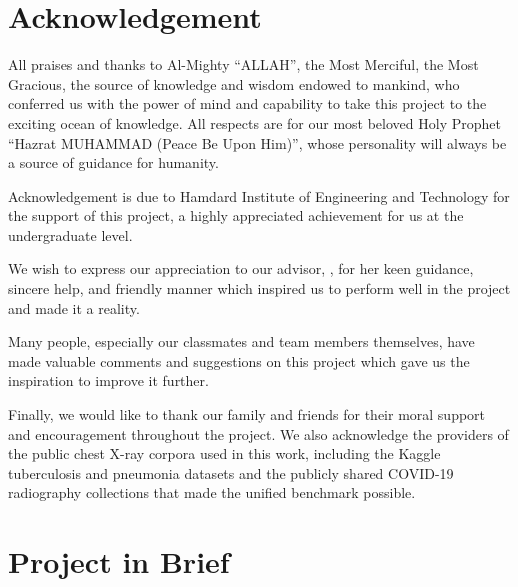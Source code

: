 \chapter*{Acknowledgement}

All praises and thanks to Al-Mighty ``ALLAH'', the Most Merciful, the Most Gracious, the source of knowledge and wisdom endowed to mankind, who conferred us with the power of mind and capability to take this project to the exciting ocean of knowledge. All respects are for our most beloved Holy Prophet ``Hazrat MUHAMMAD (Peace Be Upon Him)'', whose personality will always be a source of guidance for humanity.

Acknowledgement is due to Hamdard Institute of Engineering and Technology for the support of this project, a highly appreciated achievement for us at the undergraduate level.

We wish to express our appreciation to our advisor, \supervisorname, for her keen guidance, sincere help, and friendly manner which inspired us to perform well in the project and made it a reality.

Many people, especially our classmates and team members themselves, have made valuable comments and suggestions on this project which gave us the inspiration to improve it further.

Finally, we would like to thank our family and friends for their moral support and encouragement throughout the project. We also acknowledge the providers of the public chest X-ray corpora used in this work, including the Kaggle tuberculosis and pneumonia datasets and the publicly shared COVID-19 radiography collections that made the unified benchmark possible.

\chapter*{Project in Brief}

